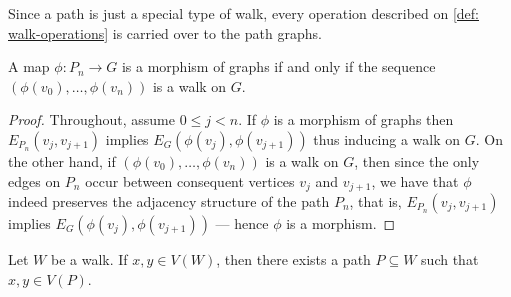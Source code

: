 Since a path is just a special type of walk, every operation described on
\cref{def: walk-operations} is carried over to the path graphs.

\begin{proposition}
\label{prop: morphism-path-walk}
A map \(\phi: P_n \to G\) is a morphism of graphs if and only if the sequence
\((\phi(v_0), \dots, \phi(v_n))\) is a walk on \(G\).
\end{proposition}

\begin{proof}
Throughout, assume \(0 \leq j < n\). If \(\phi\) is a morphism of graphs then
\(E_{P_n}(v_j, v_{j + 1})\) implies \(E_G(\phi(v_j), \phi(v_{j+1}))\) thus
inducing a walk on \(G\). On the other hand, if \((\phi(v_0), \dots,
\phi(v_n))\) is a walk on \(G\), then since the only edges on \(P_n\) occur
between consequent vertices \(v_j\) and \(v_{j+1}\), we have that \(\phi\)
indeed preserves the adjacency structure of the path \(P_n\), that is,
\(E_{P_n}(v_j, v_{j+1})\) implies \(E_G(\phi(v_j), \phi(v_{j+1}))\) --- hence
\(\phi\) is a morphism.
\end{proof}

\begin{lemma}\label{lem: paths-on-walks}
Let \(W\) be a walk. If \(x, y \in V(W)\), then there exists a path \(P
\subseteq W\) such that \(x, y \in V(P)\).
\end{lemma}

